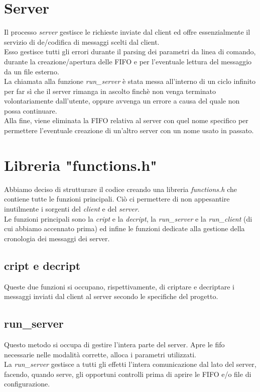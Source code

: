 \documentclass[a4paper,9pt]{article}
\begin{document}
\section{Server}
Il processo \emph{server} gestisce le richieste inviate dal client ed offre essenzialmente il servizio di de/codifica di messaggi scelti dal client.\\
Esso gestisce tutti gli errori durante il parsing dei parametri da linea di comando, durante la creazione/apertura delle FIFO e per l'eventuale lettura del messaggio da un file esterno.\\
La chiamata alla funzione \emph{run\_server} è stata messa all'interno di un ciclo infinito per far sì che il server rimanga in ascolto finchè non venga terminato volontariamente dall'utente, oppure avvenga un errore a causa del quale non possa continuare.\\
Alla fine, viene eliminata la FIFO relativa al server con quel nome specifico per permettere l'eventuale creazione di un'altro server con un nome usato in passato.

\section{Libreria "functions.h"}
Abbiamo deciso di strutturare il codice creando una libreria \emph{functions.h} che contiene tutte le funzioni principali. Ciò ci permettere di non appesantire inutilmente i sorgenti del \emph{client} e del \emph{server}.\\
Le funzioni principali sono la \emph{cript} e la \emph{decript}, la \emph{run\_server} e la \emph{run\_client} (di cui abbiamo accennato prima) ed infine le funzioni dedicate alla gestione della cronologia dei messaggi dei server.
\subsection{cript e decript}
Queste due funzioni si occupano, rispettivamente, di criptare e decriptare i messaggi inviati dal client al server secondo le specifiche del progetto.
\subsection{run\_server}
Questo metodo si occupa di gestire l'intera parte del server. Apre le fifo necessarie nelle modalità corrette, alloca i parametri utilizzati.\\ 
La \emph{run\_server} gestisce a tutti gli effetti l'intera comunicazione dal lato del server, facendo, quando serve, gli opportuni controlli prima di aprire le FIFO e/o file di configurazione.
\end{document}
